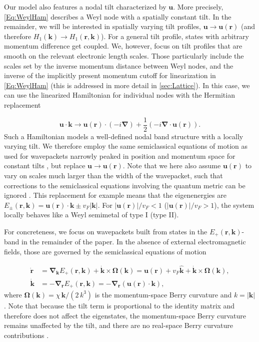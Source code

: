 \documentclass[submission, Phys]{SciPost}
\begin{document}
Our model also features a nodal tilt characterized by $\bm{u}$. More precisely, \cref{Eq:WeylHam} describes a Weyl node with a spatially constant tilt. In the remainder, we will be interested in spatially varying tilt profiles, $\bm{u} \to \bm{u}(\bm{r})$ (and therefore $H_1(\bm k)\to H_1(\bm r, \bm k)$). For a general tilt profile, states with arbitrary momentum difference get coupled. We, however, focus on tilt profiles that are smooth on the relevant electronic length scales. Those particularly include the scales set by the inverse momentum distance between Weyl nodes, and the inverse of the implicitly present momentum cutoff for linearization in \cref{Eq:WeylHam} (this is addressed in more detail in \cref{sec:Lattice}). In this case, we can use the linearized Hamiltonian for individual nodes with the Hermitian replacement \cite{De_Beule_2021,Sabsovich_2022}
 
\begin{equation}
    \bm{u} \cdot \bm{k} \to \bm{u}(\bm{r}) \cdot (-i\bm\nabla) +  \frac{1}{2}\left(-i\bm\nabla \cdot \bm{u}(\bm{r}) \right).
\end{equation}
Such a Hamiltonian models a well-defined nodal band structure with a locally varying tilt. We therefore employ the same semiclassical equations of motion as used for wavepackets narrowly peaked in position and momentum space for constant tilts \cite{Xiao2010}, but replace $\bm{u} \to \bm{u}(\bm{r})$. Note that we here also assume $\bm{u}(\bm{r})$ to vary on scales much larger than the width of the wavepacket, such that corrections to the semiclassical equations involving the quantum metric can be ignored \cite{Lapa_2019,Kozii_2021}. This replacement for example means that the eigenenergies are $E_\pm(\bm{r},\bm{k})= \bm{u}(\bm{r}) \cdot \bm{k}\pm v_F |\bm{k}|$. For $|\bm{u}(\bm{r})|/v_F<1$ ($|\bm{u}(\bm{r})|/v_F>1$), the system locally behaves like a Weyl semimetal of type I (type II). 

For concreteness, we focus on wavepackets built from states in the $E_+(\bm{r},\bm k)$-band in the remainder of the paper. In the absence of external electromagnetic fields, those are governed by the semiclassical equations of motion

\begin{align}
    \dot{\bm{r}}&= \bm\nabla_ {\bm{k}} E_+(\bm{r},\bm{k})+  \dot{\bm{k}} \times \bm{\Omega}(\bm{k})=\bm{u}(\bm{r}) + v_F \hat{\bm k} +  \dot{\bm{k}} \times \bm{\Omega}(\bm{k}),\nonumber\\ 
    \dot{\bm{k}}&=- \bm\nabla_{\bm{r}} E_+(\bm{r},\bm{k})=-\bm\nabla_ {\bm{r}}(\bm{u}(\bm{r}) \cdot \bm{k}),
    \label{eq:seom}
\end{align}
where $\bm{\Omega}(\bm{k})=\chi\,\bm{k}/(2\,k^3)$ is the momentum-space Berry curvature and $k=|\bm{k}|$. Note that because the tilt term is proportional to the identity matrix and therefore does not affect the eigenstates, the momentum-space Berry curvature remains unaffected by the tilt, and there are no real-space Berry curvature contributions \cite{Xiao2010}.
\end{document}
